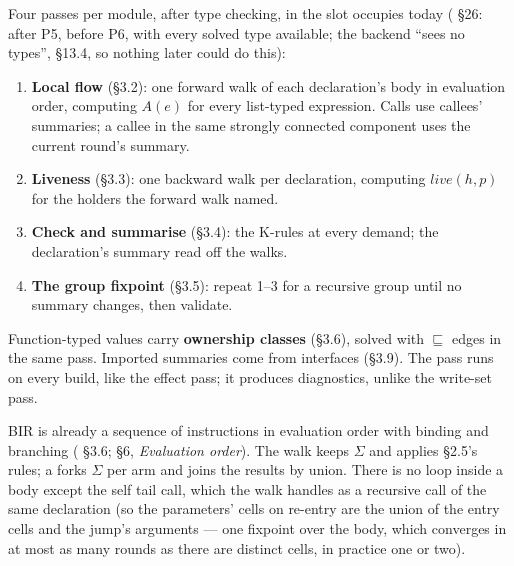 

Four passes per module, after type checking, in the slot  occupies today ( §26: after P5, before P6, with every solved type available; the backend “sees no types”, §13.4, so nothing later could do this):

\begin{enumerate}
\item \textbf{Local flow} (§3.2): one forward walk of each declaration's body in evaluation order, computing $A(e)$ for every list-typed expression. Calls use callees' summaries; a callee in the same strongly connected component uses the current round's summary.
\item \textbf{Liveness} (§3.3): one backward walk per declaration, computing $\mathit{live}(h,\allowbreak{}p)$ for the holders the forward walk named.
\item \textbf{Check and summarise} (§3.4): the K-rules at every demand; the declaration's summary read off the walks.
\item \textbf{The group fixpoint} (§3.5): repeat 1–3 for a recursive group until no summary changes, then validate.
\end{enumerate}

Function-typed values carry \textbf{ownership classes} (§3.6), solved with $\sqsubseteq$ edges in the same pass. Imported summaries come from interfaces (§3.9). The pass runs on every build, like the effect pass; it produces diagnostics, unlike the write-set pass.


BIR is already a sequence of instructions in evaluation order with  binding and  branching ( §3.6;  §6, \emph{Evaluation order}). The walk keeps $\Sigma$ and applies §2.5's rules; a  forks $\Sigma$ per arm and joins the results by union. There is no loop inside a body except the self tail call, which the walk handles as a recursive call of the same declaration (so the parameters' cells on re-entry are the union of the entry cells and the jump's arguments — one fixpoint over the body, which converges in at most as many rounds as there are distinct cells, in practice one or two).


